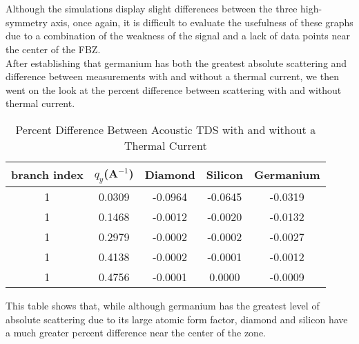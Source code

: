 \documentclass[aip,jap,12 pt,preprint]{revtex4-1}
\begin{document}
\\
\begin{figure}[htb!]
\leavevmode
{}
\\
\end{figure}
Although the simulations display slight differences between the three high-symmetry axis, once again, it is difficult to evaluate the usefulness of these graphs due to a combination of the weakness of the signal and a lack of data points near the center of the FBZ.
\\
After establishing that germanium has both the greatest absolute scattering and difference between measurements with and without a thermal current, we then went on the look at the percent difference between scattering with and without thermal current.
\begin{table}[]
\centering
\caption{Percent Difference Between Acoustic TDS with and without a Thermal Current}
\begin{tabular}{|c|c|c|c|c|}
\hline
branch index & $q_y$(A$^{-1}$) & Diamond & Silicon & Germanium \\ \hline
1            & 0.0309                      & -0.0964 & -0.0645 & -0.0319   \\ \hline
1            & 0.1468                      & -0.0012 & -0.0020 & -0.0132   \\ \hline
1            & 0.2979                      & -0.0002 & -0.0002 & -0.0027   \\ \hline
1            & 0.4138                      & -0.0002 & -0.0001 & -0.0012   \\ \hline
1            & 0.4756                      & -0.0001 & 0.0000  & -0.0009   \\ \hline
\end{tabular}
\end{table}
This table shows that, while although germanium has the greatest level of absolute scattering due to its large atomic form factor, diamond and silicon have a much greater percent difference near the center of the zone.
\end{document}
